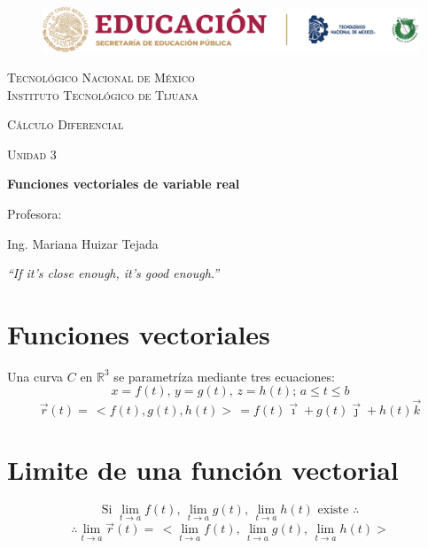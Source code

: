 \documentclass[letterpaper, 12pt]{article}
\begin{document}
    
    \begin{titlepage}
        \begin{figure}[ht]
            \centering
            \includegraphics[width=15cm]{logosITT.png}
        \end{figure}
        \centering
        {\scshape\LARGE Tecnológico Nacional de México\\Instituto Tecnológico de Tijuana\par}
        \vspace{1cm}
        {\scshape\Large Cálculo Diferencial\par}
        \vspace{1cm}
        {\scshape\Large Unidad 3\par}
        \vspace{1.5cm}
        {\huge\bfseries Funciones vectoriales de variable real\par}
        \vfill
        Profesora: \par
        Ing. Mariana Huizar Tejada
        
        \vfill

        {\large \emph{``If it's close enough, it's good enough.''}}


    \end{titlepage}

    \newpage
        \pagestyle{empty}
        \tableofcontents

    \newpage
        \pagestyle{fancy}
        \section{Funciones vectoriales}
        Una curva \(C\) en \(\mathbb{R}^3\) se parametríza mediante tres ecuaciones:
        \[x=f(t),\, y=g(t),\, z=h(t); \, a\leq t\leq b\]
        \[\vec{r}(t)=\,<\!f(t), g(t), h(t)\!>\,=f(t)\vec{\imath}+g(t)\vec{\jmath}+h(t)\vec{k}\]
        \section{Limite de una función vectorial}
        \[\text{Si }\lim_{t\rightarrow a}f(t),\,\lim_{t\rightarrow a}g(t),\,\lim_{t\rightarrow a}h(t) \text{ existe }\therefore\]
        \[\therefore\lim_{t\rightarrow a}\vec{r}(t)=\,<\!\lim_{t\rightarrow a}f(t),\,\lim_{t\rightarrow a}g(t),\,\lim_{t\rightarrow a}h(t)\!>\]
\end{document}
